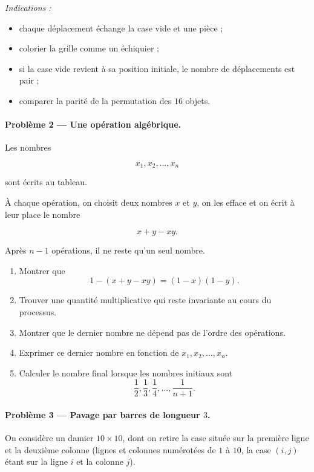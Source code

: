 \emph{Indications :}

\begin{itemize}
    \item chaque déplacement échange la case vide et une pièce ;
    \item colorier la grille comme un échiquier ;
    \item si la case vide revient à sa position initiale, le nombre de
    déplacements est pair ;
    \item comparer la parité de la permutation des \(16\) objets.
\end{itemize}

\paragraph{Problème 2 --- Une opération algébrique.}
Les nombres

\[
x_1,x_2,\dots,x_n
\]

sont écrits au tableau.

À chaque opération, on choisit deux nombres \(x\) et \(y\), on les efface et
on écrit à leur place le nombre

\[
x+y-xy.
\]

Après \(n-1\) opérations, il ne reste qu'un seul nombre.

\begin{enumerate}
    \item Montrer que
    \[
    1-(x+y-xy)=(1-x)(1-y).
    \]

    \item Trouver une quantité multiplicative qui reste invariante au cours du
    processus.

    \item Montrer que le dernier nombre ne dépend pas de l'ordre des opérations.

    \item Exprimer ce dernier nombre en fonction de
    \(x_1,x_2,\dots,x_n\).

    \item Calculer le nombre final lorsque les nombres initiaux sont
    \[
    \frac12,\frac13,\frac14,\dots,\frac1{n+1}.
    \]
\end{enumerate}

\paragraph{Problème 3 --- Pavage par barres de longueur \(3\).}
On considère un damier \(10\times10\), dont on retire la case située sur la
première ligne et la deuxième colonne (lignes et colonnes numérotées de
\(1\) à \(10\), la case \((i,j)\) étant sur la ligne \(i\) et la colonne \(j\)).

